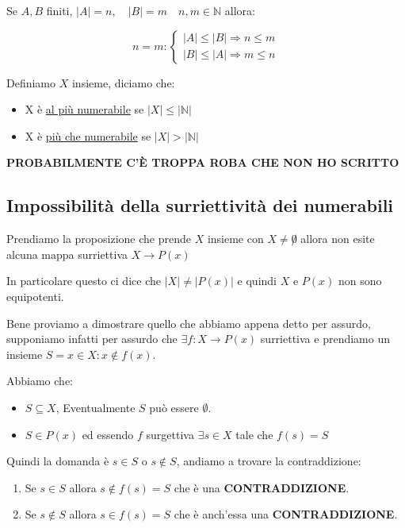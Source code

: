\documentclass{article}
\begin{document}
Se $A,B$ finiti, $|A| = n, \quad |B|= m \quad n,m \in \mathbb{N}$ allora: 

\[n=m :
\begin{cases}
        |A| \le |B| \Rightarrow n \le m \\
        |B| \le |A| \Rightarrow m \le n
\end{cases}
\]


Definiamo $X$ insieme, diciamo che:
\begin{itemize}
        \item X è \underline{al più numerabile} se $|X| \le |\mathbb{N}|$	
        \item X è \underline{più che numerabile} se $|X| > |\mathbb{N}|$
\end{itemize}

\textbf{PROBABILMENTE C'È TROPPA ROBA CHE NON HO SCRITTO} \newline


\subsection{Impossibilità della surriettività dei numerabili}
Prendiamo la proposizione che prende $X$ insieme con $X \not =  \not 0$ allora non esite alcuna mappa surriettiva $X \to P(x)$ \par
In particolare questo ci dice che $|X| \not = |P(x)|$ e quindi $X$ e $P(x)$ non sono equipotenti.

Bene proviamo a dimostrare quello che abbiamo appena detto per assurdo, supponiamo infatti per assurdo che $\exists f : X \to P(x)$ surriettiva e prendiamo un insieme $S = {x \in X : x \not \in f(x)}$. \par 
Abbiamo che:
\begin{itemize}
        \item $S \subseteq X$, Eventualmente $S$ può essere $\emptyset$.
        \item $S \in P(x)$ ed essendo $f$ surgettiva $\exists s \in X$ tale che $f(s) = S$ 
\end{itemize}
Quindi la domanda è $s \in S$ o $s \not \in S$, andiamo a trovare la contraddizione:
\begin{enumerate}
        \item Se $s \in S$ allora $s \not \in f(s) = S$ che è una \textbf{CONTRADDIZIONE}.
        \item Se $s \not \in S$ allora $s \in f(s) = S$ che è anch'essa una \textbf{CONTRADDIZIONE}.
\end{enumerate}
\end{document}
